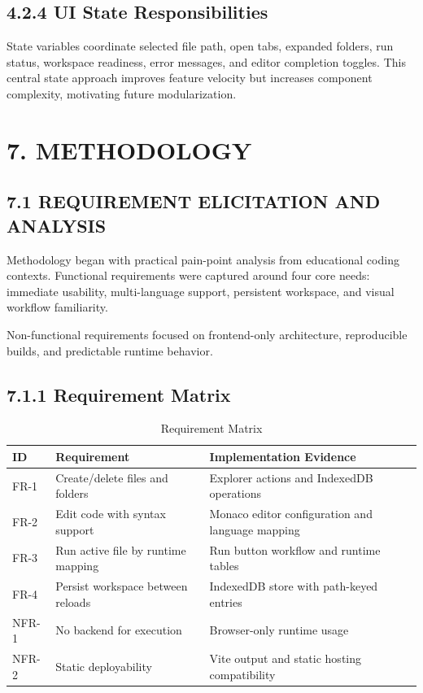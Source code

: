 \subsection*{4.2.4 UI State Responsibilities}
State variables coordinate selected file path, open tabs, expanded folders, run status, workspace readiness, error messages, and editor completion toggles. This central state approach improves feature velocity but increases component complexity, motivating future modularization.

\newpage
\section{7. METHODOLOGY}

\subsection{7.1 REQUIREMENT ELICITATION AND ANALYSIS}
Methodology began with practical pain-point analysis from educational coding contexts. Functional requirements were captured around four core needs: immediate usability, multi-language support, persistent workspace, and visual workflow familiarity.

Non-functional requirements focused on frontend-only architecture, reproducible builds, and predictable runtime behavior.

\subsection*{7.1.1 Requirement Matrix}
\begin{table}[H]
\centering
\caption{Requirement Matrix}
\begin{tabular}{p{1.3cm}p{5.0cm}p{5.5cm}}
\toprule
\textbf{ID} & \textbf{Requirement} & \textbf{Implementation Evidence} \\
\midrule
FR-1 & Create/delete files and folders & Explorer actions and IndexedDB operations \\
FR-2 & Edit code with syntax support & Monaco editor configuration and language mapping \\
FR-3 & Run active file by runtime mapping & Run button workflow and runtime tables \\
FR-4 & Persist workspace between reloads & IndexedDB store with path-keyed entries \\
NFR-1 & No backend for execution & Browser-only runtime usage \\
NFR-2 & Static deployability & Vite output and static hosting compatibility \\
\bottomrule
\end{tabular}
\end{table}

